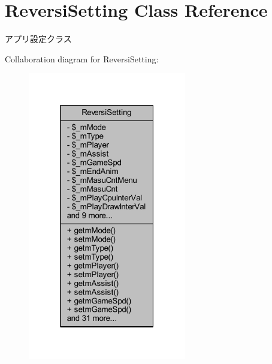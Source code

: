 \hypertarget{class_reversi_setting}{}\section{Reversi\+Setting Class Reference}
\label{class_reversi_setting}


アプリ設定クラス  




Collaboration diagram for Reversi\+Setting\+:\nopagebreak
\begin{figure}[H]
\begin{center}
\leavevmode
\includegraphics[width=196pt]{class_reversi_setting__coll__graph}
\end{center}
\end{figure}
